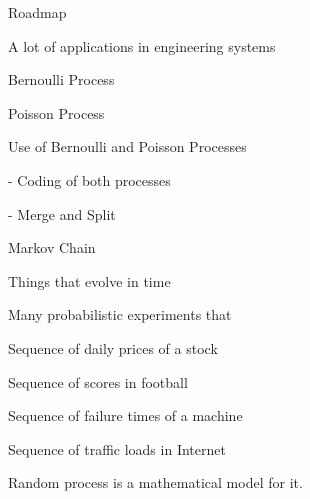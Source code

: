 \documentclass[fleqn,aspectratio=169]{beamer}
\begin{document}
\begin{frame}{Roadmap}

\plitemsep 0.1in

\bci 
\item A lot of applications in engineering systems


\bigskip

\item {}

\medskip
\item Bernoulli Process
\item Poisson Process
\item Use of Bernoulli and Poisson Processes

- Coding of both processes

- Merge and Split

\medskip
\item Markov Chain

\eci 

\end{frame}

\begin{frame}{Things that evolve in time}


{
\plitemsep 0.1in
\bci 
\item<1-> Many probabilistic experiments that 
\bci
\item<2-> Sequence of daily prices of a stock
\item<2-> Sequence of scores in football
\item<2-> Sequence of failure times of a machine
\item<2-> Sequence of traffic loads in Internet
\eci

\item Random process is a mathematical model for it.



\eci 
}
{
\centering
{}
}
\end{frame}
\end{document}
